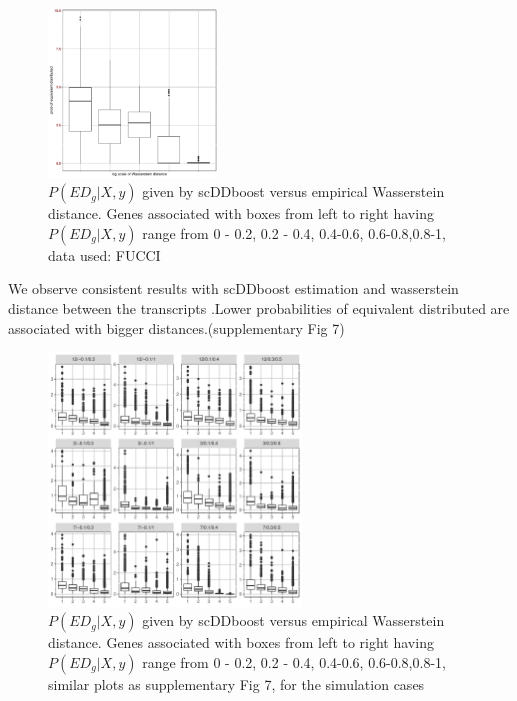 \documentclass[aoas,preprint]{imsart}
\begin{document}
\begin{figure}[h!]
\includegraphics[width = 0.4\textwidth]{Figs/Fucci_wadist.pdf}
\caption{$P(ED_g|X,y)$ given by scDDboost versus empirical Wasserstein distance. 
Genes associated with boxes from left to right having $P(ED_g|X,y)$ range from 0 - 0.2, 0.2 - 0.4, 0.4-0.6, 0.6-0.8,0.8-1, data used: FUCCI}
 \label{fig:7}
\end{figure}

We observe consistent results with scDDboost estimation and wasserstein distance between the transcripts .Lower probabilities of equivalent distributed are associated with bigger distances.(supplementary Fig 7)


\begin{figure}[h!]
\includegraphics[width = 0.6\textwidth]{Figs/simu_wadist.pdf}
\caption{$P(ED_g|X,y)$ given by scDDboost versus empirical Wasserstein distance. 
Genes associated with boxes from left to right having $P(ED_g|X,y)$ range from 0 - 0.2, 0.2 - 0.4, 0.4-0.6, 0.6-0.8,0.8-1, similar plots as supplementary Fig 7, for the simulation cases}
 \label{fig:8}
\end{figure}
\end{document}
